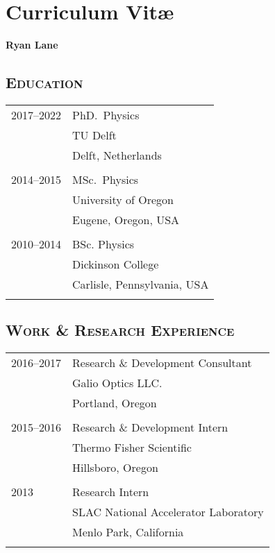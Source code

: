 \chapter*{Curriculum Vit\ae}

\makeatletter
\begin{center}
    {\Large\bfseries Ryan \titleshape Lane}
\end{center}
\makeatother

\noindent
\section*{\textsc{Education}}
\begin{tabular}{p{}l}
    2017--2022 & PhD.\ Physics \\
               & TU Delft\\
               & Delft, Netherlands \\
    \\
    2014--2015 & MSc.\ Physics \\
               & University of Oregon \\
               & Eugene, Oregon, USA \\
    \\
    2010--2014 & BSc. Physics \\
               & Dickinson College \\
               & Carlisle, Pennsylvania, USA \\
    \\
\end{tabular}


\section*{\textsc{Work \& Research Experience}}
\begin{tabular}{p{}l}
    2016--2017 & Research \& Development Consultant \\
               & Galio Optics LLC. \\
               & Portland, Oregon \\
    \\
    2015--2016 & Research \& Development Intern \\
               & Thermo Fisher Scientific \\
               & Hillsboro, Oregon \\
    \\
    2013       & Research Intern \\
               & SLAC National Accelerator Laboratory \\
               & Menlo Park, California \\
    \\
\end{tabular}

